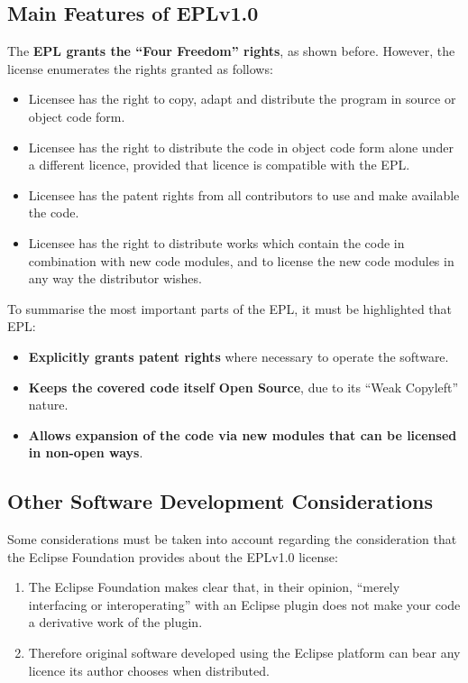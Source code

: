 \documentclass[a4paper, 12pt]{book}
\begin{document}
\subsection{Main Features of EPLv1.0}
The \textbf{EPL grants the ``Four Freedom'' rights}, as shown before. However, the license enumerates the rights granted as follows:
\begin{itemize}\itemsep0pt
 \item{Licensee has the right to copy, adapt and distribute the program in source or object code form}.
 \item{Licensee has the right to distribute the code in object code form alone under a different licence, provided that licence is compatible with the EPL}.
 \item{Licensee has the patent rights from all contributors to use and make available the code}.
  \item{Licensee has the right to distribute works which contain the code in combination with new code modules, and to license the new code modules in any way the distributor wishes}.
\end{itemize}

To summarise the most important parts of the EPL, it must be highlighted that EPL:
\begin{itemize}\itemsep0pt
 \item{\textbf{Explicitly grants patent rights} where necessary to operate the software}.
 \item{\textbf{Keeps the covered code itself Open Source}}, due to its ``Weak Copyleft'' nature.
 \item{\textbf{Allows expansion of the code via new modules that can be licensed in non-open ways}}.
\end{itemize}\itemsep0pt

\subsection{Other Software Development Considerations}
Some considerations must be taken into account regarding the consideration that the Eclipse Foundation provides about the EPLv1.0 license:
\begin{enumerate}
 \item{The Eclipse Foundation makes clear that, in their opinion, ``merely interfacing or interoperating'' with an Eclipse plugin does not make your code a derivative work of the plugin}.
 \item{Therefore original software developed using the Eclipse platform can bear any licence its author chooses when distributed}.
\end{enumerate}
\end{document}
